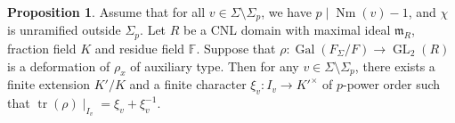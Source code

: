 \documentclass[12pt]{amsart}
\theoremstyle{plain}
\theoremstyle{definition}
\newtheorem{rem}[thm]{Remark}
\newtheorem{prop}[thm]{Proposition}
\theoremstyle{remark}
\begin{document}
 
 	
 \begin{prop} \label{char}
 	Assume that for all $v \in \Sigma \setminus \Sigma_p$, we have $p \mid \operatorname{Nm}(v)-1$, and  $\chi$ is unramified outside $ \Sigma_p$.
 	Let $R$ be a CNL domain with maximal ideal $\mathfrak{m}_R$, fraction field $K$ and residue field $\mathbb{F}$. Suppose that $\rho: \operatorname{Gal}(F_{\Sigma}/F) \to \operatorname{GL}_2(R)$ is a deformation of $\rho_x$ of auxiliary type. Then for any $v \in \Sigma \setminus \Sigma_p$, there exists a finite extension $K'/K$ and a finite character $\xi_v: I_v \to K'^{\times}$ of $p$-power order such that $\operatorname{tr}(\rho) \mid_{I_v}= \xi_v+\xi_v^{-1}$.
 \end{prop}
 
\end{document}
